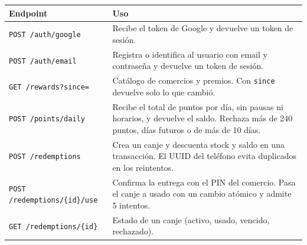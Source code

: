 \begin{table}[H]
\centering\small
\begin{tabularx}{\textwidth}{@{}l L@{}}
\toprule
\textbf{Endpoint} & \textbf{Uso} \\
\midrule
\texttt{POST /auth/google} & Recibe el token de Google y devuelve un token de sesión. \\
\texttt{POST /auth/email} & Registra o identifica al usuario con email y contraseña y devuelve un token de sesión. \\
\texttt{GET /rewards?since=} & Catálogo de comercios y premios. Con \texttt{since} devuelve solo lo que cambió. \\
\texttt{POST /points/daily} & Recibe el total de puntos por día, sin pausas ni horarios, y devuelve el saldo. Rechaza más de 240 puntos, días futuros o de más de 10 días. \\
\texttt{POST /redemptions} & Crea un canje y descuenta stock y saldo en una transacción. El UUID del teléfono evita duplicados en los reintentos. \\
\texttt{POST /redemptions/\{id\}/use} & Confirma la entrega con el PIN del comercio. Pasa el canje a usado con un cambio atómico y admite 5 intentos. \\
\texttt{GET /redemptions/\{id\}} & Estado de un canje (activo, usado, vencido, rechazado). \\
\bottomrule
\end{tabularx}
\end{table}
